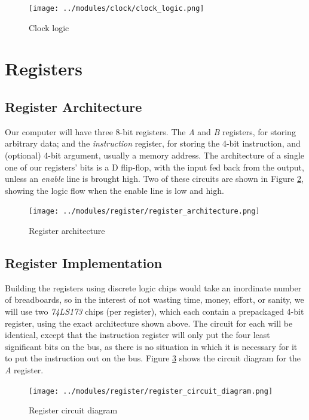 \documentclass[12pt]{article}
\begin{document}
\begin{FlushLeft}
\begin{figure}[h]
  \begin{center}
    \texttt{[image: ../modules/clock/clock\_logic.png]}
    \caption{Clock logic}
    \label{fig:clock_logic_diagram}
  \end{center}
\end{figure}

\clearpage



\section{Registers}
\subsection{Register Architecture}
Our computer will have three 8-bit registers. The \textit{A} and \textit{B} registers, for storing arbitrary data; and the \textit{instruction} register, for storing the 4-bit instruction, and (optional) 4-bit argument, usually a memory address. The architecture of a single one of our registers' bits is a D flip-flop, with the input fed back from the output, unless an \textit{enable} line is brought high. Two of these circuits are shown in Figure \ref{fig:register_architecture}, showing the logic flow when the enable line is low and high. \\

\begin{figure}[h]
  \begin{center}
    \texttt{[image: ../modules/register/register\_architecture.png]}
    \caption{Register architecture}
    \label{fig:register_architecture}
  \end{center}
\end{figure}

\clearpage


\subsection{Register Implementation}
Building the registers using discrete logic chips would take an inordinate number of breadboards, so in the interest of not wasting time, money, effort, or sanity, we will use two \textit{74LS173} chips (per register), which each contain a prepackaged 4-bit register, using the exact architecture shown above. The circuit for each will be identical, except that the instruction register will only put the four least significant bits on the bus, as there is no situation in which it is necessary for it to put the instruction out on the bus. Figure \ref{fig:register_circuit_diagram} shows the circuit diagram for the \textit{A} register. \\

\begin{figure}[h]
  \begin{center}
    \texttt{[image: ../modules/register/register\_circuit\_diagram.png]}
    \caption{Register circuit diagram}
    \label{fig:register_circuit_diagram}
  \end{center}
\end{figure}




\end{FlushLeft}

\clearpage
\end{document}
